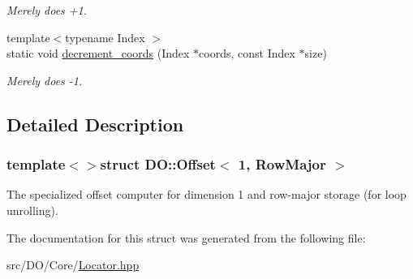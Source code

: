 \begin{DoxyCompactItemize}
\begin{DoxyCompactList}\small\item\em Merely does +1. \end{DoxyCompactList}\item 
\hypertarget{struct_d_o_1_1_offset_3_011_00_01_row_major_01_4_ac1c91b6ec96f5963221003a8cae3d912}{{\footnotesize template$<$typename Index $>$ }\\static void \hyperlink{struct_d_o_1_1_offset_3_011_00_01_row_major_01_4_ac1c91b6ec96f5963221003a8cae3d912}{decrement\-\_\-coords} (Index $\ast$coords, const Index $\ast$size)}\label{struct_d_o_1_1_offset_3_011_00_01_row_major_01_4_ac1c91b6ec96f5963221003a8cae3d912}

\begin{DoxyCompactList}\small\item\em Merely does -\/1. \end{DoxyCompactList}\end{DoxyCompactItemize}


\subsection{Detailed Description}
\subsubsection*{template$<$$>$struct D\-O\-::\-Offset$<$ 1, Row\-Major $>$}

The specialized offset computer for dimension 1 and row-\/major storage (for loop unrolling). 

The documentation for this struct was generated from the following file\-:\begin{DoxyCompactItemize}
\item 
src/\-D\-O/\-Core/\hyperlink{_locator_8hpp}{Locator.\-hpp}\end{DoxyCompactItemize}
